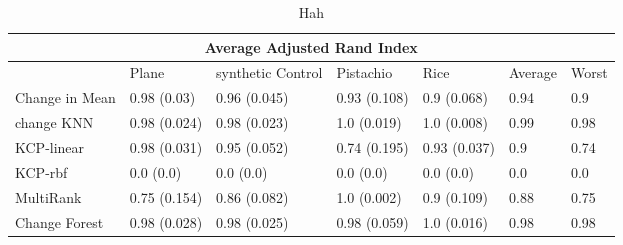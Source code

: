 
\begin{table}[!ht]
\centering
{
\begin{tabular}{ |p{2cm}|p{1.5cm}|p{1.5cm}|p{1.5cm}|p{1.5cm}|p{1.5cm}|p{1.5cm}|}
\hline
\multicolumn{7}{|c|}{Average Adjusted Rand Index} \\
\hline

\hline
 & Plane & synthetic Control & Pistachio & Rice & Average & Worst  \\
\hline
\hline
Change in Mean & 0.98 (0.03) & 0.96 (0.045) & 0.93 (0.108) & 0.9 (0.068)& 0.94 & 0.9 \\
change KNN & 0.98 (0.024) & 0.98 (0.023) & 1.0 (0.019) & 1.0 (0.008)& 0.99 & 0.98 \\
KCP-linear & 0.98 (0.031) & 0.95 (0.052) & 0.74 (0.195) & 0.93 (0.037)& 0.9 & 0.74 \\
KCP-rbf & 0.0 (0.0) & 0.0 (0.0) & 0.0 (0.0) & 0.0 (0.0)& 0.0 & 0.0 \\
MultiRank & 0.75 (0.154) & 0.86 (0.082) & 1.0 (0.002) & 0.9 (0.109)& 0.88 & 0.75 \\
Change Forest & 0.98 (0.028) & 0.98 (0.025) & 0.98 (0.059) & 1.0 (0.016)& 0.98 & 0.98 \\
\hline
\end{tabular}}
\\
\caption{Hah}
\vspace{10pt}
\label{tab:yourlabel}
\end{table}